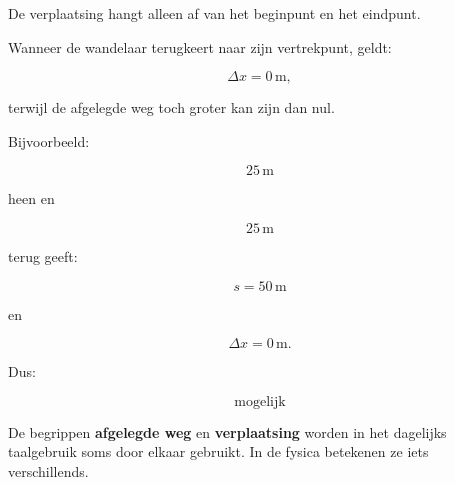 \documentclass{ximera}
\begin{document}
\begin{oefening}{\oefB\ESS}
\begin{question}
\begin{oplossing}
    De verplaatsing hangt alleen af van het beginpunt en het eindpunt.
    
    Wanneer de wandelaar terugkeert naar zijn vertrekpunt, geldt:
    
    \[
    \Delta x=0\,\mathrm{m},
    \]
    
    terwijl de afgelegde weg toch groter kan zijn dan nul.
    
    Bijvoorbeeld:
    
    \[
    25\,\mathrm{m}
    \]
    
    heen en
    
    \[
    25\,\mathrm{m}
    \]
    
    terug geeft:
    
    \[
    s=50\,\mathrm{m}
    \]
    
    en
    
    \[
    \Delta x=0\,\mathrm{m}.
    \]
    
    Dus:
    
    \[
    \boxed{\text{mogelijk}}
    \]
    
    \end{oplossing}
    \end{question}
  \end{oefening}





De begrippen \textbf{afgelegde weg} en \textbf{verplaatsing} worden
in het dagelijks taalgebruik soms door elkaar gebruikt. In de fysica
betekenen ze iets verschillends.
\end{document}
